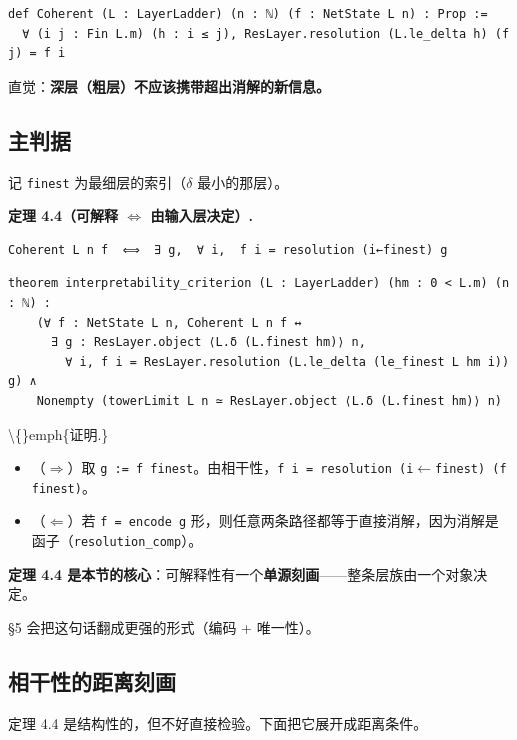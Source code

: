 \documentclass[11pt,a4paper]{ctexart}
\begin{document}
\begin{lstlisting}
def Coherent (L : LayerLadder) (n : ℕ) (f : NetState L n) : Prop :=
  ∀ (i j : Fin L.m) (h : i ≤ j), ResLayer.resolution (L.le_delta h) (f j) = f i
\end{lstlisting}

直觉：\textbf{深层（粗层）不应该携带超出消解的新信息。}

\subsection{主判据}

记 \texttt{finest} 为最细层的索引（\texttt{\ensuremath{\delta}} 最小的那层）。

\textbf{定理 4.4（可解释 \ensuremath{\Longleftrightarrow} 由输入层决定）.}

\begin{lstlisting}
Coherent L n f  ⟺  ∃ g,  ∀ i,  f i = resolution (i←finest) g
\end{lstlisting}

\begin{lstlisting}
theorem interpretability_criterion (L : LayerLadder) (hm : 0 < L.m) (n : ℕ) :
    (∀ f : NetState L n, Coherent L n f ↔
      ∃ g : ResLayer.object ⟨L.δ (L.finest hm)⟩ n,
        ∀ i, f i = ResLayer.resolution (L.le_delta (le_finest L hm i)) g) ∧
    Nonempty (towerLimit L n ≃ ResLayer.object ⟨L.δ (L.finest hm)⟩ n)
\end{lstlisting}

\textbackslash\{\}emph\{证明.\}

\begin{itemize}
\item （\ensuremath{\Longrightarrow}）取 \texttt{g := f finest}。由相干性，\texttt{f i = resolution (i\ensuremath{\leftarrow}finest) (f finest)}。
\item （\ensuremath{\Longleftarrow}）若 \texttt{f = encode g} 形，则任意两条路径都等于直接消解，因为消解是函子（\texttt{resolution\_comp}）。
\end{itemize}

\textbf{定理 4.4 是本节的核心}：可解释性有一个\textbf{单源刻画}——整条层族由一个对象决定。

§5 会把这句话翻成更强的形式（编码 + 唯一性）。

\subsection{相干性的距离刻画}

定理 4.4 是结构性的，但不好直接检验。下面把它展开成距离条件。
\end{document}

